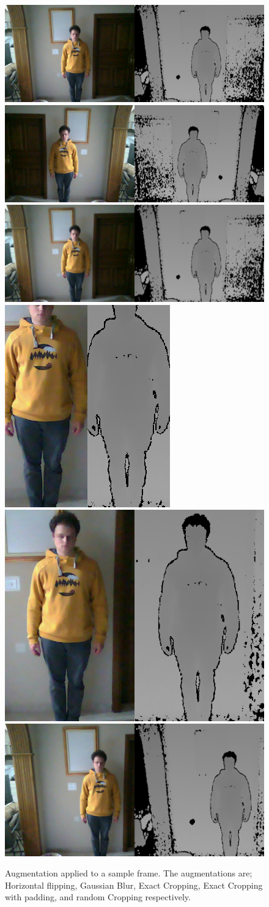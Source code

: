 \begin{figure}
    \includegraphics[width=.33\textwidth]{figures/Model/Augmentation/Original.png}\hfill
    \includegraphics[width=.33\textwidth]{figures/Model/Augmentation/Flipped.png}\hfill
    \includegraphics[width=.33\textwidth]{figures/Model/Augmentation/GaussianBlur.png}
    \\[\smallskipamount]
    \includegraphics[width=.33\textwidth]{figures/Model/Augmentation/Cropped.png}\hfill
    \includegraphics[width=.33\textwidth]{figures/Model/Augmentation/CroppedPad50.png}\hfill
    \includegraphics[width=.33\textwidth]{figures/Model/Augmentation/RandomCropped.png}
    \caption[Data Augmentation]{Augmentation applied to a sample frame. The augmentations are; Horizontal flipping, Gaussian Blur, Exact Cropping, Exact Cropping with padding, and random Cropping respectively.}\label{fig:augmentation}
\end{figure}


